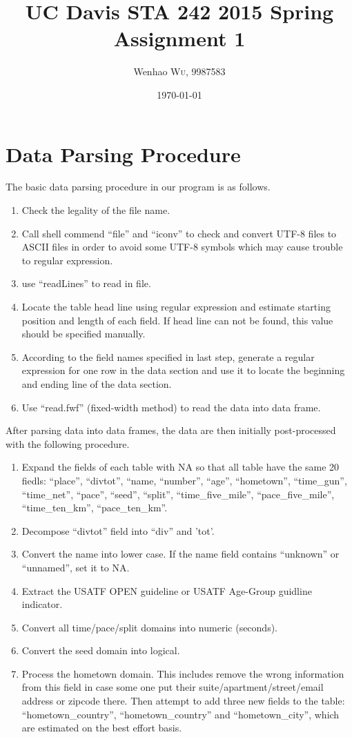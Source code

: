 \documentclass[twocolumn]{article}
\title{UC Davis STA 242 2015 Spring Assignment 1} %
\author{Wenhao \textsc{Wu}, 9987583} %
\date{\today} %
\begin{document}
\maketitle %


\section{Data Parsing Procedure}
The basic data parsing procedure in our program is as follows.
\begin{enumerate}
    \item Check the legality of the file name.
    \item Call shell commend ``file'' and ``iconv'' to check and convert UTF-8
    files to ASCII files in order to avoid some UTF-8 symbols which may cause
    trouble to regular expression.
    \item use ``readLines'' to read in file.
    \item Locate the table head line using regular expression and estimate
    starting position and length of each field. If head line can not be found,
    this value should be specified manually.
    \item According to the field names specified in last step, generate a
    regular expression for one row in the data section and use it to locate the
    beginning and ending line of the data section.
    \item Use ``read.fwf'' (fixed-width method) to read the data into data
    frame.
\end{enumerate}
After parsing data into data frames, the data are then initially post-processed
with the following procedure.
\begin{enumerate}
    \item Expand the fields of each table with NA so that all table have the
    same 20 fiedls: ``place'', ``divtot'', ``name, ``number'', ``age'',
    ``hometown'', ``time\_gun'', ``time\_net'', ``pace'', ``seed'', ``split'',
    ``time\_five\_mile'', ``pace\_five\_mile'', ``time\_ten\_km'',
    ``pace\_ten\_km''.
    \item Decompose ``divtot'' field into ``div'' and 'tot'.
    \item Convert the name into lower case. If the name field contains
    ``unknown'' or ``unnamed'', set it to NA.
    \item Extract the USATF OPEN guideline or USATF Age-Group guidline
    indicator.
    \item Convert all time/pace/split domains into numeric (seconds).
    \item Convert the seed domain into logical.
    \item Process the hometown domain. This includes remove the wrong
    information from this field in case some one put their
    suite/apartment/street/email address or zipcode there. Then attempt to
    add three new fields to the table: ``hometown\_country'',
    ``hometown\_country'' and ``hometown\_city'', which are estimated on the
    best effort basis.
\end{enumerate}
\end{document}
